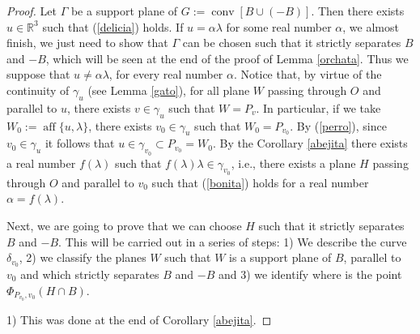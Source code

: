 \documentclass[12pt]{amsart}
\newcommand{\aff}{\operatorname*{aff}}
\newcommand{\conv}{\operatorname*{conv}}
\newcommand{\Rt}{\mathbb{R}^3}
\begin{document}
 \begin{proof}
                 Let $\Gamma$ be a support plane of $G:=\conv[B\cup (-B)]$. Then there exists 
                 $u\in \Rt$ such that (\ref{delicia}) holds. If $u= \alpha \lambda$ for some real number 
                 $\alpha$, we almost finish, we just need to show that $\Gamma$ can be chosen such that 
                 it strictly separates $B$ and $-B$, which will be seen at the end of the proof of Lemma 
                 \ref{orchata}. Thus we suppose that $u\not= \alpha \lambda$, for every real number 
                 $\alpha$. Notice that, by virtue of the continuity of 
                 $\gamma_u$ (see Lemma \ref{gato}), for all plane $W$ passing through $O$ and 
                 parallel to $u$, there exists $v\in \gamma_u$ such that $W=P_v$. In particular, if we 
                 take $W_0:=\aff\{u,\lambda\}$, there exists $v_0\in \gamma_u$ such that $W_0=P_{v_0}$.
                 By (\ref{perro}), since $v_0\in \gamma_u$ it follows that 
                 $u \in \gamma_{v_0}\subset P_{v_0}= W_0$. By the Corollary \ref{abejita} there 
                 exists a real number $f(\lambda)$ such that $f(\lambda)\lambda \in \gamma_{v_0}$, i.e.,
                 there exists a plane $H$ passing through $O$ and parallel to $v_0$ such that 
                 (\ref{bonita}) holds for a real number $\alpha=f(\lambda)$.
 
                   Next, we are going to prove that we can choose $H$ such that it strictly separates 
                  $B$ and $-B$.  This will be carried out in a series of steps: 1) We describe the curve 
                  $\delta_{v_0}$, 2) we classify the planes $W$ such that $W$ is a support plane of $B$, 
                  parallel to $v_{0}$ and which strictly separates $B$ and $-B$ and 3) we identify where is 
                  the point $\Phi_{P_{v_0}, {v_0}}(H\cap B)$.
  
                  1) This was done at the end of Corollary \ref{abejita}.  
                  

\end{proof}
\end{document}
